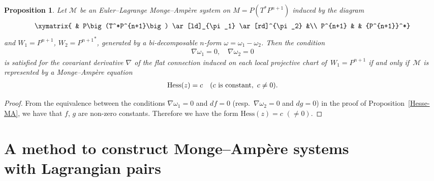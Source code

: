 \documentclass[pdftex]{sigma}
\newtheorem{Prop}[Th]{Proposition}
\begin{document}
\begin{Prop}
Let $\mathcal{M}$ be an Euler--Lagrange Monge--Amp{\`e}re system
on $M=P(T^*P^{n+1})$ induced by the diagram
\begin{gather*}
\xymatrix{
& P\big(T^*P^{n+1}\big) \ar[ld]_{\pi_1} \ar[rd]^{\pi_2}  &\\
P^{n+1} &  & {P^{n+1}}^*}
\end{gather*}
and $W_1=P^{n+1}$, $W_2={P^{n+1}}^* $,
generated by a bi-decomposable
$n$-form $\omega = \omega_1-\omega_2$.
Then the condition
\begin{gather*}
\nabla \omega_1=0, \quad \nabla \omega_2=0
\end{gather*}
is satisfied for the covariant derivative $\nabla$ of
the flat connection induced on each local projective chart
of~$W_1=P^{n+1}$
if and only if~${\mathcal M}$ is represented by
a Monge--Amp{\`e}re equation
\begin{gather*}
\mathrm{Hess}(z) = c \quad (c \ \text{\rm is constant}, \ c\not=0).
\end{gather*}
\end{Prop}

\begin{proof}
From the equivalence between the conditions
$\nabla \omega_1=0$ and $df=0$
(resp.\ $\nabla \omega_2=0$ and $dg=0$) in the proof of
Proposition~\ref{Hesse-MA},
we have that $f$, $g$ are non-zero constants.
Therefore we have the form $\mathrm{Hess}(z) = c$ $(\not=0)$.
\end{proof}

\section[A method to construct Monge-Amp{\`e}re systems
with Lagrangian pairs]{A method to construct Monge--Amp{\`e}re systems\\
with Lagrangian pairs}
\label{A method to construct systems with Lagrangian pairs.}
\end{document}
